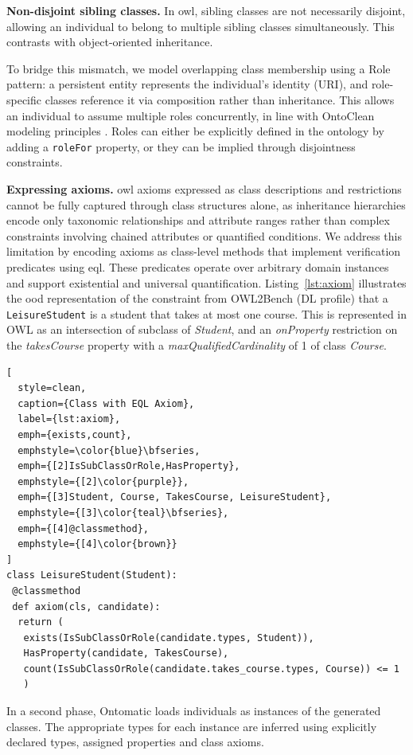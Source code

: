 \documentclass{article}
\begin{document}
\textbf{Non-disjoint sibling classes.} In \ac{owl}, sibling classes are not necessarily disjoint, allowing an individual to belong to multiple sibling classes simultaneously. This contrasts with object-oriented inheritance. 

To bridge this mismatch, we model overlapping class membership using a Role pattern: a persistent entity represents the individual’s identity (URI), and role-specific classes reference it via composition rather than inheritance. This allows an individual to assume multiple roles concurrently, in line with OntoClean modeling principles \cite{Guarino2004}. Roles can either be explicitly defined in the ontology by adding a \texttt{roleFor} property, or they can be implied through disjointness constraints.

\textbf{Expressing axioms.} \ac{owl} axioms expressed as class descriptions and restrictions cannot be fully captured through class structures alone, as inheritance hierarchies encode only taxonomic relationships and attribute ranges rather than complex constraints involving chained attributes or quantified conditions. We address this limitation by encoding axioms as class-level methods that implement verification predicates using \ac{eql}. These predicates operate over arbitrary domain instances and support existential and universal quantification. Listing~\ref{lst:axiom} illustrates the \ac{ood} representation of the constraint from OWL2Bench (DL profile) that a \texttt{LeisureStudent} is a student that takes at most one course. This is represented in OWL as an intersection of subclass of \textit{Student}, and an \textit{onProperty} restriction on the \textit{takesCourse} property with a \textit{maxQualifiedCardinality} of 1 of class \textit{Course}.

\begin{lstlisting}[
  style=clean,
  caption={Class with EQL Axiom},
  label={lst:axiom},
  emph={exists,count},
  emphstyle=\color{blue}\bfseries,
  emph={[2]IsSubClassOrRole,HasProperty},
  emphstyle={[2]\color{purple}},
  emph={[3]Student, Course, TakesCourse, LeisureStudent},
  emphstyle={[3]\color{teal}\bfseries},
  emph={[4]@classmethod},
  emphstyle={[4]\color{brown}}
]
class LeisureStudent(Student):
 @classmethod
 def axiom(cls, candidate):
  return (
   exists(IsSubClassOrRole(candidate.types, Student)),
   HasProperty(candidate, TakesCourse),
   count(IsSubClassOrRole(candidate.takes_course.types, Course)) <= 1
   )
\end{lstlisting}


In a second phase, Ontomatic loads individuals as instances of the generated classes. The appropriate types for each instance are inferred using explicitly declared types, assigned properties and class axioms.
\end{document}
